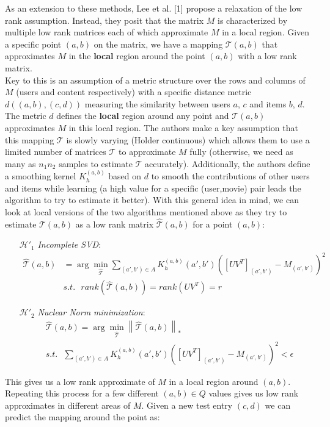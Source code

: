\documentclass{article} %
\begin{document}
As an extension to these methods, Lee et al. [1] propose a relaxation of the low rank assumption. Instead, they posit that the matrix $M$ is characterized by multiple low rank matrices each of which approximate $M$ in a local region. Given a specific point $(a,b)$ on the matrix, we have a mapping $\mathcal{T}(a,b)$ that approximates $M$ in the \textbf{local} region around the point $(a,b)$ with a low rank matrix. \\
Key to this is an assumption of a metric structure over the rows and columns of $M$ (users and content respectively) with a specific distance metric $d((a,b),(c,d))$ measuring the similarity between users $a$, $c$ and items $b$, $d$. The metric $d$ defines the \textbf{local} region around any point and $\mathcal{T}(a,b)$ approximates $M$ in this local region. The authors make a key assumption that this mapping $\mathcal{T}$ is slowly varying (Holder continuous) which allows them to use a limited number of matrices $\mathcal{T}$ to approximate $M$ fully (otherwise, we need as many as $n_1n_2$ samples to estimate $\mathcal{T}$ accurately). Additionally, the authors define a smoothing kernel $K_h^{(a,b)}$ based on $d$ to smooth the contributions of other users and items while learning (a high value for a specific (user,movie) pair leads the algorithm to try to estimate it better). With this general idea in mind, we can look at local versions of the two algorithms mentioned above as they try to estimate $\mathcal{T}(a,b)$ as a low rank matrix $\hat{\mathcal{T}}(a,b)$ for a point $(a,b)$:
\begin{itemize}
\item[$\mathcal{H'}_1$] \emph{Incomplete SVD}: 
\begin{align}
 \hat{\mathcal{T}}(a,b) &= \arg \min_{\hat{\mathcal{T}}} \sum_{(a',b') \in A} K_h^{(a,b)}(a',b') \left([UV^T]_{(a',b')} - M_{(a',b')}\right)^2 \\
&s.t. \ \ \ rank(\hat{\mathcal{T}}(a,b)) = rank(UV^T) = r
\end{align}
\item[$\mathcal{H'}_2$] \emph{Nuclear Norm minimization}:
\begin{align}
&\hat{\mathcal{T}}(a,b) = \arg \min_{\hat{\mathcal{T}}} \left\| \hat{\mathcal{T}}(a,b) \right\|_* \\
&s.t. \ \ \ \sum_{(a',b') \in A} K_h^{(a,b)}(a',b') \left([UV^T]_{(a',b')} - M_{(a',b')}\right)^2 < \epsilon
\end{align}
\end{itemize}
This gives us a low rank approximate of $M$ in a local region around $(a,b)$. Repeating this process for a few different $(a,b) \in Q$ values gives us low rank approximates in different areas of $M$. Given a new test entry $(c,d)$ we can predict the mapping around the point as:
\end{document}
